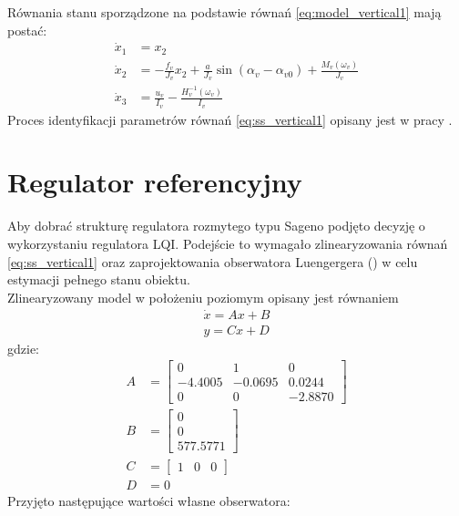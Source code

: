 %
Równania stanu sporządzone na podstawie równań \ref{eq:model_vertical1} mają postać:
\begin{equation}
\begin{aligned}
\dot x_1 &= x_2\\
\dot x_2 &= -\frac{f_v}{J_v}x_2+\frac{a}{J_v}\sin (\alpha_v-\alpha_{v0})+\frac{M_v(\omega_v)}{J_v}\\
\dot x_3 &= \frac{u_v}{I_v}-\frac{H_v^{-1}(\omega_v)}{I_v}
\end{aligned}
\label{eq:ss_vertical1}
\end{equation}
%
Proces identyfikacji parametrów równań \ref{eq:ss_vertical1} opisany jest w pracy \cite{LP}.

\section{Regulator referencyjny}
Aby dobrać strukturę regulatora rozmytego typu Sageno podjęto decyzję o wykorzystaniu regulatora LQI. Podejście to wymagało zlinearyzowania równań \ref{eq:ss_vertical1} oraz zaprojektowania obserwatora Luengergera (\cite{LP}) w celu estymacji pełnego stanu obiektu.\\ 
Zlinearyzowany model w położeniu poziomym opisany jest równaniem 
\begin{equation}\label{key}
\begin{aligned}
\dot x = Ax + B \\
y = Cx + D
\end{aligned}
\end{equation}
gdzie:
\begin{equation}
\begin{aligned}
A &=
\begin{bmatrix}
0 & 1 & 0\\
-4.4005 & -0.0695 & 0.0244\\
0 & 0 & -2.8870
\end{bmatrix}\\
B &=
\begin{bmatrix}
0\\
0\\
577.5771
\end{bmatrix}\\
C &=
\begin{bmatrix}
1 & 0 & 0
\end{bmatrix}\\
D &= 0
\end{aligned}
\end{equation} 
Przyjęto następujące wartości własne obserwatora:
